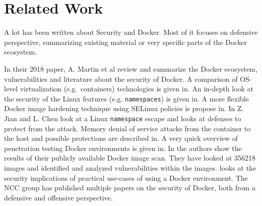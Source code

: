 \chapter{Related Work}\label{chapter:relatedwork}
A lot has been written about Security and Docker. Most of it focuses on defensive perspective, summarizing existing material or very specific parts of the Docker ecosystem.

In their 2018 paper, A. Martin et al review and summarize the Docker ecosystem, vulnerabilities and literature about the security of Docker\cite{Docker-Ecosystem-Vulnerability-Analysis}. A comparison of OS-level virtualization (e.g.\ containers) technologies is given in\cite{Security-OS-level-Virtualization}. An in-depth look at the security of the Linux features (e.g. \lstinline{namespaces}) is given in\cite{Analysis-Docker-Security}. A more flexible Docker image hardening technique using SELinux policies is propose in\cite{DockerPolicyModules}. In\cite{Defense-Docker-Escape} Z. Jian and L. Chen look at a Linux \lstinline{namespace} escape and looks at defenses to protect from the attack. Memory denial of service attacks from the container to the host and possible protections are described in\cite{Securing-Docker-Containers-from-DOS}. A very quick overview of penetration testing Docker environments is given in\cite{Research-Pentesting-Docker-Environment}. In\cite{Study-Vulnerabilities-Docker-Hub} the authors show the results of their publicly available Docker image scan. They have looked at 356218 images and identified and analyzed vulnerabilities within the images.\cite{To-Docker-Not-To-Docker} looks at the security implications of practical use-cases of using a Docker environment. The NCC group has published multiple papers on the security of Docker, both from a defensive\cite{Understanding-and-Hardening-Linux-Containers} and offensive\cite{Abusing-Containers} perspective.

